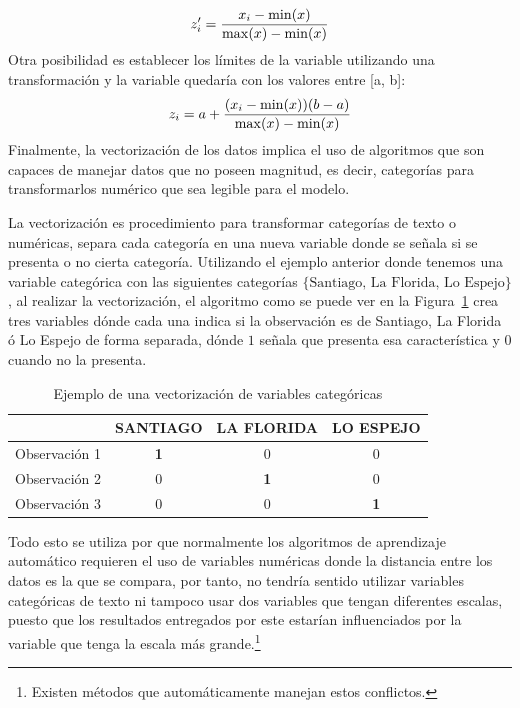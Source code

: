 \begin{description}
  \begin{equation}
  \centering
        z^{\prime}_{i}=\frac{x_i-\min(x)}{\max(x)-\min(x)}
  \end{equation}
  Otra posibilidad es establecer los límites de la variable utilizando una transformación y la variable quedaría con los valores entre [a, b]:
  \begin{equation}
  \centering
       z_i=a + \frac{(x_i-\min(x))(b - a)}{\max(x)-\min(x)}
  \end{equation}
  Finalmente, la vectorización de los datos implica el uso de algoritmos que son capaces de manejar datos que no poseen magnitud, es decir, categorías para transformarlos numérico que sea legible para el modelo.
  
  La vectorización es procedimiento para transformar categorías de texto o numéricas, separa cada categoría en una nueva variable donde se señala si se presenta o no cierta categoría. Utilizando el ejemplo anterior donde tenemos una variable categórica con las siguientes categorías $\{\textrm{Santiago, La Florida, Lo Espejo}\}$, al realizar la vectorización, el algoritmo como se puede ver en la Figura~\ref{fig:vect} crea tres variables dónde cada una indica si la observación es de Santiago, La Florida ó Lo Espejo de forma separada, dónde $1$ señala que presenta esa característica y $0$ cuando no la presenta.
    \begin{table}[H]
    \centering
    \begin{tabular}{l|c|c|c|}
    \cline{2-4}
     & \multicolumn{1}{l|}{\textbf{SANTIAGO}} & \multicolumn{1}{l|}{\textbf{LA FLORIDA}} & \multicolumn{1}{l|}{\textbf{LO ESPEJO}} \\ \hline
    \multicolumn{1}{|l|}{Observación 1} & \textbf{1} & 0 & 0 \\ \hline
    \multicolumn{1}{|l|}{Observación 2} & 0 & \textbf{1} & 0 \\ \hline
    \multicolumn{1}{|l|}{Observación 3} & 0 & 0 & \textbf{1} \\ \hline
    \end{tabular}
    \caption{Ejemplo de una vectorización de variables categóricas}
    \label{fig:vect}
    \end{table}
      
  Todo esto se utiliza por que normalmente los algoritmos de aprendizaje automático requieren el uso de variables numéricas donde la distancia entre los datos es la que se compara, por tanto, no tendría sentido utilizar variables categóricas de texto ni tampoco usar dos variables que tengan diferentes escalas, puesto que los resultados entregados por este estarían influenciados por la variable que tenga la escala más grande.\footnote{Existen métodos que automáticamente manejan estos conflictos.}

\end{description}
